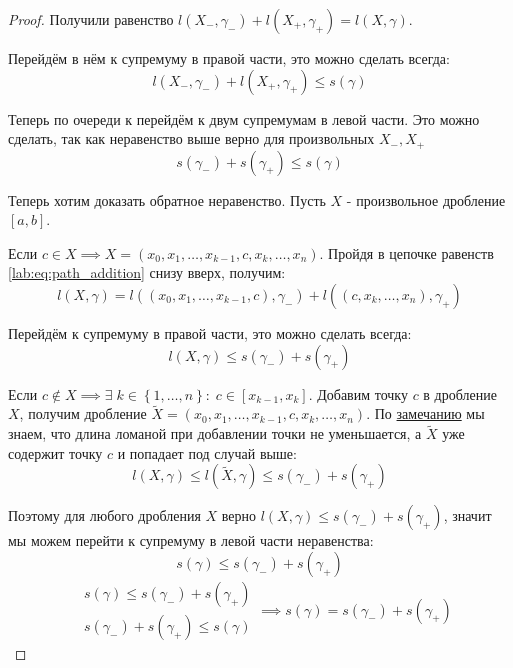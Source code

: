 \documentclass[../main.tex]{subfiles}
\begin{document}
\begin{proof}
    Получили равенство \(l \left( X_-, \gamma _-\right)+l\left( X_+, \gamma _+\right)=l\left( X, \gamma \right)\).

    Перейдём в нём к супремуму в правой части, это можно сделать всегда: 
    \[ l \left( X_-, \gamma _-\right)+l \left( X_+, \gamma _+\right) \leq s\left( \gamma \right)\]

    Теперь по очереди к перейдём к двум супремумам в левой части. Это можно сделать, так как неравенство выше верно для произвольных \( X_-, X_+\) 
    \[ s\left( \gamma _-\right)+s\left( \gamma _+\right) \leq s\left( \gamma \right)\]

    Теперь хотим доказать обратное неравенство. Пусть \( X\) - произвольное дробление \( \left[ a,b\right]\).

    Если \( c \in X \implies X=\left( x_0,x_1, \dots,x_{k-1},c,x_k, \dots,x_n\right)\). Пройдя в цепочке равенств \ref{lab:eq:path_addition} снизу вверх, получим:
    \[ l \left( X, \gamma \right)=l\left( \left( x_0, x_1, \dots,x_{k-1},c\right), \gamma _-\right)+l \left( \left( c,x_k, \dots,x_n\right), \gamma _+\right)\]

    Перейдём к супремуму в правой части, это можно сделать всегда:
    \[ l \left( X, \gamma \right) \leq s\left( \gamma _-\right)+s\left( \gamma _+\right)\]

    Если \( c \notin X \implies \exists \; k \in \left\{ 1, \dots,n\right\}:\;c \in \left[ x_{k-1}, x_k\right]\). Добавим точку \( c\) в дробление 
    \( X\), получим дробление \( \tilde{ X}=\left( x_0,x_1, \dots,x_{k-1}, c, x_k, \dots, x_n\right)\). По \hyperlink{note:add_point_in_X}{замечанию} мы знаем, что
    длина ломаной при добавлении точки не уменьшается, а \( \tilde{ X}\) уже содержит точку \( c\) и попадает под случай выше:
    \[ l \left( X, \gamma \right) \leq l ( \tilde{ X}, \gamma ) \leq s\left( \gamma _-\right)+s\left( \gamma _+\right)\]

    Поэтому для любого дробления \( X\) верно \( l \left( X, \gamma \right) \leq s\left( \gamma _-\right)+s\left( \gamma _+\right)\), значит мы можем перейти к супремуму в левой части неравенства:
    \[ s\left( \gamma \right) \leq s\left( \gamma _-\right)+s\left( \gamma _+\right)\]
    \begin{equation*}
        \begin{aligned}
            &s\left( \gamma \right) \leq s\left( \gamma _-\right)+s\left( \gamma _+\right)\\ 
            &s\left( \gamma _-\right)+s\left( \gamma _+\right) \leq s\left( \gamma \right)
        \end{aligned}
        \implies 
        s\left( \gamma \right)=s\left( \gamma _-\right)+s\left( \gamma _+\right)
    \end{equation*}
\end{proof}
\end{document}

